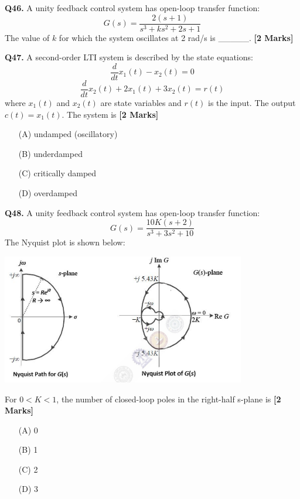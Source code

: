 \documentclass[11pt]{article}
\newcommand{\questionb}[2]{
    \noindent\textbf{Q#2.} #1 \hfill \textbf{[2 Marks]}
}
\begin{document}
\vspace{0.5cm}

\questionb{A unity feedback control system has open-loop transfer function:
\[ G(s) = \frac{2(s+1)}{s^3 + ks^2 + 2s + 1} \]
The value of $k$ for which the system oscillates at 2 rad/s is \_\_\_\_\_.}{46}

\vspace{0.5cm}

\questionb{A second-order LTI system is described by the state equations:
\[
\frac{d}{dt}x_1(t) - x_2(t) = 0
\]
\[
\frac{d}{dt}x_2(t) + 2x_1(t) + 3x_2(t) = r(t)
\]
where $x_1(t)$ and $x_2(t)$ are state variables and $r(t)$ is the input. The output $c(t) = x_1(t)$. The system is}{47}
\begin{enumerate}
    \item[(A)] undamped (oscillatory)
    \item[(B)] underdamped
    \item[(C)] critically damped
    \item[(D)] overdamped
\end{enumerate}

\vspace{0.5cm}

\questionb{A unity feedback control system has open-loop transfer function:
\[
G(s) = \frac{10K(s+2)}{s^3 + 3s^2 + 10}
\]
The Nyquist plot is shown below:
\begin{center}
\includegraphics[width=0.8\textwidth]{figures/48.png}
\end{center}
For $0 < K < 1$, the number of closed-loop poles in the right-half s-plane is}{48}
\begin{enumerate}
    \item[(A)] 0
    \item[(B)] 1
    \item[(C)] 2
    \item[(D)] 3
\end{enumerate}
\end{document}
